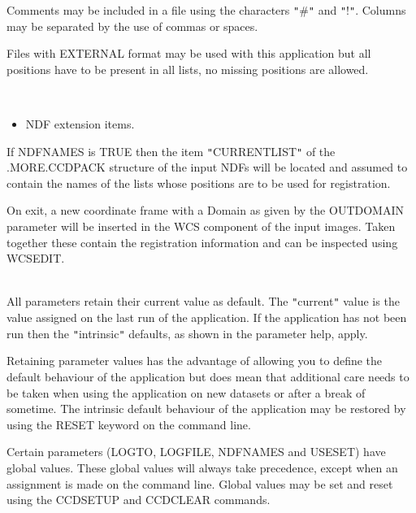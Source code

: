 \documentclass[twoside,11pt]{article}
\newcommand{\htmlref}[2]{#1}
\renewcommand{\_}{\texttt{\symbol{95}}}
\newcommand{\qt}[1]{{\tt "}#1{\tt "}}
\newcommand{\xroutine}[1]{\htmlref{{\sc #1}}{#1}}
\newcommand{\sstdiytopic}[2]{\item[#1:] \mbox{} \\[1.3ex] #2}
\newcommand{\sstitemlist}[1]{
  \mbox{} \\
  \vspace{-3.5ex}
  \begin{itemize}
     #1
  \end{itemize}
}
\newcommand{\sstitem}{\item}
\newcommand{\sstdiytopic}[2]{\item[{#1}] #2 }
\newcommand{\sstitemlist}[1]{
      \begin{itemize}
         #1
      \end{itemize}
      \\
   }
\newcommand{\sstitem}{\item}
\begin{document}
{{        Comments may be included in a file using the characters \qt{\#} and
        \qt{!}. Columns may be separated by the use of commas or spaces.

        Files with EXTERNAL format may be used with this application but
        all positions have to be present in all lists, no missing
        positions are allowed.

      \sstitemlist{

         \sstitem
         NDF extension items.

      }
        If NDFNAMES is TRUE then the item \qt{CURRENT\_LIST} of the
        .MORE.CCDPACK structure of the input NDFs will be located
        and assumed to contain the names of the lists whose positions
        are to be used for registration.

        On exit, a new coordinate frame with a Domain as given by the
        OUTDOMAIN parameter will be inserted in the WCS component of 
        the input images.  Taken together these contain the registration
        information and can be inspected using WCSEDIT.
   }
   \sstdiytopic{
      Behaviour of parameters
   } {
      All parameters retain their current value as default. The
      \qt{current} value is the value assigned on the last run of the
      application. If the application has not been run then the
      \qt{intrinsic} defaults, as shown in the parameter help, apply.

      Retaining parameter values has the advantage of allowing you to
      define the default behaviour of the application but does mean
      that additional care needs to be taken when using the application
      on new datasets or after a break of sometime.  The intrinsic
      default behaviour of the application may be restored by using the
      RESET keyword on the command line.

      Certain parameters (LOGTO, LOGFILE, NDFNAMES and USESET) have global
      values. These global values will always take precedence, except
      when an assignment is made on the command line.  Global values may
      be set and reset using the \xroutine{CCDSETUP} and \xroutine{CCDCLEAR} commands.
   }
}
\end{document}
